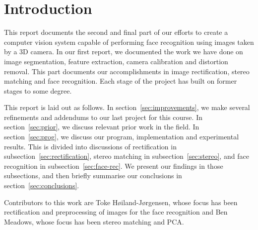 
\section{Introduction}
This report documents the second and final part of our efforts to create a computer vision
system capable of performing face recognition using images taken by a 3D camera. In our
first report, we documented the work we have done on image segmentation,
feature extraction, camera calibration and distortion removal. This part
documents our accomplishments in image rectification, stereo matching and face
recognition. Each stage of the project has built on former stages to some degree.

This report is laid out as follows. In section~\ref{sec:improvements}, we make
several refinements and addendums to our last project for this course. In
section~\ref{sec:prior}, we discuss relevant prior work in the field. In
section~\ref{sec:prog}, we discuss our program, implementation and experimental
results. This is divided into discussions of rectification in
subsection~\ref{sec:rectification}, stereo matching in
subsection~\ref{sec:stereo}, and face recognition in
subsection~\ref{sec:face-rec}. We present our findings in those subsections, and
then briefly summarise our conclusions in section~\ref{sec:conclusions}.

Contributors to this work are Toke Høiland-Jørgensen, whose focus has been
rectification and preprocessing of images for the face recognition and
Ben Meadows, whose focus has been stereo matching and PCA.
